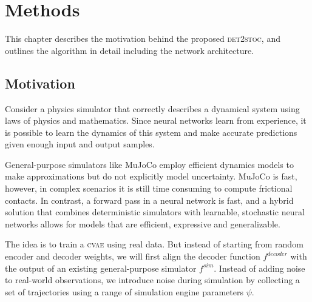 \documentclass{kththesis}
\newcommand{\cvae}{\textsc{cvae}}
\newcommand{\dettostoc}{\textsc{det2stoc}}
\newcommand{\fsimulator}{\ensuremath{f^{sim}}}
\newcommand{\fdecoder}{\ensuremath{f^{decoder}}}
\begin{document}
\chapter{Methods}
\label{methods}

This chapter describes the motivation behind the proposed \dettostoc{}, and outlines the algorithm in detail including the network architecture.

\section{Motivation}


Consider a physics simulator that correctly describes a dynamical system using laws of physics and mathematics. Since neural networks learn from experience, it is possible to learn the dynamics of this system and make accurate predictions given enough input and output samples.


General-purpose simulators like MuJoCo employ efficient dynamics models to make approximations but do not explicitly model uncertainty. MuJoCo is fast, however, in complex scenarios it is still time consuming to compute frictional contacts. In contrast, a forward pass in a neural network is fast, and a hybrid solution that combines deterministic simulators with learnable, stochastic neural networks allows for models that are efficient, expressive and generalizable.


The idea is to train a \cvae{} using real data. But instead of starting from random encoder and decoder weights, we will first align the decoder function $\fdecoder{}$ with the output of an existing general-purpose simulator $\fsimulator{}$. Instead of adding noise to real-world observations, we introduce noise during simulation by collecting a set of trajectories using a range of simulation engine parameters $\psi$.
\end{document}
